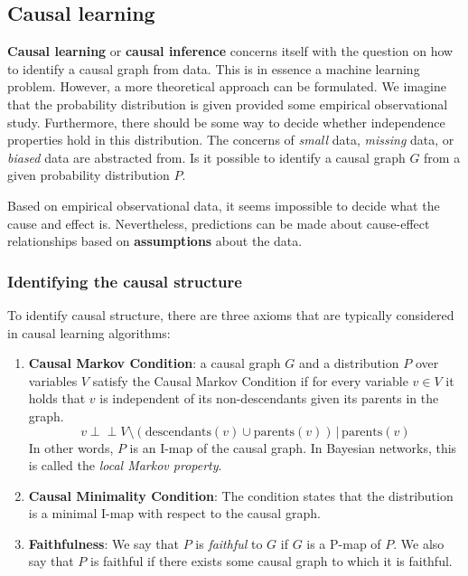 \documentclass{article}
\newcommand{\giv}{\,|\,}
\newcommand{\indep}{\perp \!\!\! \perp}
\begin{document}
\subsection{Causal learning}

\textbf{Causal learning} or \textbf{causal inference} concerns itself with the question on how to identify a causal graph from data. This is in essence a machine learning problem. However, a more theoretical approach can be formulated. We imagine that the probability distribution is given provided some empirical observational study. Furthermore, there should be some way to decide whether independence properties hold in this distribution. The concerns of \textit{small} data, \textit{missing} data, or \textit{biased} data are abstracted from. Is it possible to identify a causal graph $G$ from a given probability distribution $P$. 

Based on empirical observational data, it seems impossible to decide what the cause and effect is. Nevertheless, predictions can be made about cause-effect relationships based on \textbf{assumptions} about the data. 

\subsubsection{Identifying the causal structure}

To identify causal structure, there are three axioms that are typically considered in causal learning algorithms:
\begin{enumerate}
    \item \textbf{Causal Markov Condition}: a causal graph $G$ and a distribution $P$ over variables $V$ satisfy the Causal Markov Condition if for every variable $v \in V$ it holds that $v$ is independent of its non-descendants given its parents in the graph. 
    $$
        v \indep V \text{\textbackslash} (\text{descendants}(v) \cup \text{parents}(v)) \giv \text{parents}(v)
    $$
    \noindent In other words, $P$ is an I-map of the causal graph. In Bayesian networks, this is called the \textit{local Markov property}. 
    \item \textbf{Causal Minimality Condition}: The condition states that the distribution is a minimal I-map with respect to the causal graph. 
    \item \textbf{Faithfulness}: We say that $P$ is \textit{faithful} to $G$ if $G$ is a P-map of $P$. We also say that $P$ is faithful if there exists some causal graph to which it is faithful. 
\end{enumerate}
\end{document}
